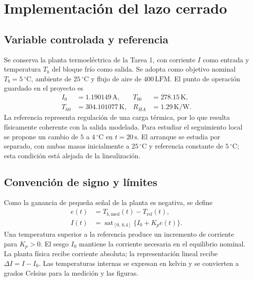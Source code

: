 \section{Implementación del lazo cerrado}
\subsection{Variable controlada y referencia}
Se conserva la planta termoeléctrica de la Tarea 1, con corriente $I$ como entrada y temperatura $T_b$ del bloque frío como salida. Se adopta como objetivo nominal $T_b=5\,{}^\circ\mathrm C$, ambiente de $25\,{}^\circ\mathrm C$ y flujo de aire de $400\,\mathrm{LFM}$. El punto de operación guardado en el proyecto es
\begin{align}
 I_0&=1.190149\,\mathrm A, &T_{b0}&=278.15\,\mathrm K,\\
 T_{h0}&=304.101077\,\mathrm K, &R_{HA}&=1.29\,\mathrm{K/W}.
\end{align}
La referencia representa regulación de una carga térmica, por lo que resulta físicamente coherente con la salida modelada. Para estudiar el seguimiento local se propone un cambio de $5$ a $4\,{}^\circ\mathrm C$ en $t=20\,\mathrm s$. El arranque se estudia por separado, con ambas masas inicialmente a $25\,{}^\circ\mathrm C$ y referencia constante de $5\,{}^\circ\mathrm C$; esta condición está alejada de la linealización.

\subsection{Convención de signo y límites}
Como la ganancia de pequeña señal de la planta es negativa, se define
\begin{align}
 e(t)&=T_{b,\mathrm{med}}(t)-T_{\mathrm{ref}}(t),\\
 I(t)&=\operatorname{sat}_{[0,\,6.4]}\{I_0+K_p e(t)\}.
\end{align}
Una temperatura superior a la referencia produce un incremento de corriente para $K_p>0$. El sesgo $I_0$ mantiene la corriente necesaria en el equilibrio nominal. La planta física recibe corriente absoluta; la representación lineal recibe $\Delta I=I-I_0$. Las temperaturas internas se expresan en kelvin y se convierten a grados Celsius para la medición y las figuras.

